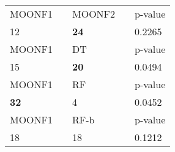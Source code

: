 \begin{tabular}{ l l l l l}
\midrule
{MOONF1} & & {MOONF2} & & {p-value}\\
12 & & \textbf{24} & & 0.2265\\
\midrule
{MOONF1} & & {DT} & & {p-value}\\
15 & & \textbf{20} & & 0.0494\\
\midrule
{MOONF1} & & {RF} & & {p-value}\\
\textbf{32} & & 4 & & 0.0452\\
\midrule
{MOONF1} & & {RF-b} & & {p-value}\\
18 & & 18 & & 0.1212\\
\midrule
\end{tabular}
